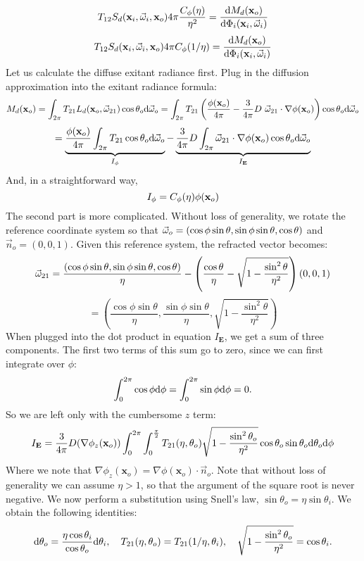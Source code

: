 \documentclass[10pt,a4paper]{article}
\begin{document}
$$
 T_{12} S_d(\mathbf{x}_i, \vec{\omega}_i, \mathbf{x}_o) 4\pi\frac{C_{\phi}(\eta)}{\eta^2} =   \frac{\text{d} M_d(\mathbf{x}_o)}{\text{d} \Phi_i(\mathbf{x}_i, \vec{\omega}_i)} 
$$
$$
 T_{12} S_d(\mathbf{x}_i, \vec{\omega}_i, \mathbf{x}_o) 4\pi C_{\phi}(1/\eta) =   \frac{\text{d} M_d(\mathbf{x}_o)}{\text{d} \Phi_i(\mathbf{x}_i, \vec{\omega}_i)} 
$$
Let us calculate the diffuse exitant radiance first. Plug in the diffusion approximation into the exitant radiance formula:
$$
M_d(\mathbf{x}_o) = \int_{2\pi} T_{21}  L_{d}(\mathbf{x}_o, \omegavec_{21}) \cos \theta_o \de \omegavec_o = \int_{2\pi} T_{21}  \left(\frac{\phi(\mathbf{x}_o)}{4\pi} - \frac{3}{4\pi} D\ \omegavec_{21} \cdot \nabla \phi(\mathbf{x}_o)\right) \cos \theta_o \de \omegavec_o
$$
$$
= \underbrace{\frac{\phi(\mathbf{x}_o)}{4\pi} \int_{2\pi} T_{21} \cos \theta_o \text{d} \vec{\omega}_o}_{I_\phi}  - \underbrace{\frac{3}{4\pi} D \int_{2\pi}  \vec{\omega}_{21} \cdot \nabla \phi(\mathbf{x}_o) \cos \theta_o \text{d} \vec{\omega}_o }_{I_{\mathbf{E}}}
$$
And, in a straightforward way, 
$$
I_\phi = C_{\phi}(\eta) \phi(\mathbf{x}_o)
$$
The second part is more complicated. Without loss of generality, we rotate the reference coordinate system so that $\vec{\omega}_o = (\cos\phi\sin\theta, \sin\phi \sin\theta, \cos\theta)$ and $\vec{n}_o = (0,0,1)$.  Given this reference system, the refracted vector becomes:
$$
\vec{\omega}_{21} = \frac{(\cos\phi\sin\theta, \sin\phi \sin\theta, \cos\theta)}{\eta} - \left(\frac{\cos\theta}{\eta} - \sqrt{1 - \frac{\sin^2\theta}{\eta^2}}\right) (0,0,1) 
$$
$$
= \left(\frac{\cos\phi\sin\theta}{\eta}, \frac{\sin\phi \sin\theta}{\eta},  \sqrt{1 - \frac{\sin^2\theta}{\eta^2}}\right)
$$
When plugged into the dot product in equation $I_{\mathbf{E}}$, we get a sum of three components. The first two terms of this sum go to zero, since we can first integrate over $\phi$:
$$
\int_0^{2\pi} \cos\phi \text{d} \phi = \int_0^{2\pi} \sin\phi \text{d} \phi = 0.
$$
So we are left only with the cumbersome $z$ term:
$$
I_{\mathbf{E}} = \frac{3}{4\pi} D (\nabla \phi_z(\mathbf{x}_o)) \int_{0}^{2\pi}\int_{0}^{\frac{\pi}{2}} T_{21}(\eta,\theta_o) \sqrt{1 - \frac{\sin^2\theta_o}{\eta^2}} \cos \theta_o \sin \theta_o \text{d} \theta_o \text{d} \phi
$$
Where we note that $\nabla \phi_z(\mathbf{x}_o) = \nabla\phi(\mathbf{x}_o) \cdot \vec{n}_o$. Note that without loss of generality we can assume $\eta > 1$, so that the argument of the square root is never negative.  We now perform a substitution using  Snell's law, $\sin\theta_o = \eta \sin\theta_i$. We obtain  the following identities:
$$
\de \theta_o = \frac{\eta \cos\theta_i}{\cos\theta_o} \de \theta_i,\ \ \ T_{21}(\eta,\theta_o) = T_{21}(1/\eta,\theta_i),\ \ \ \sqrt{1 - \frac{\sin^2\theta_o}{\eta^2}} = \cos\theta_i.
$$
\end{document}
